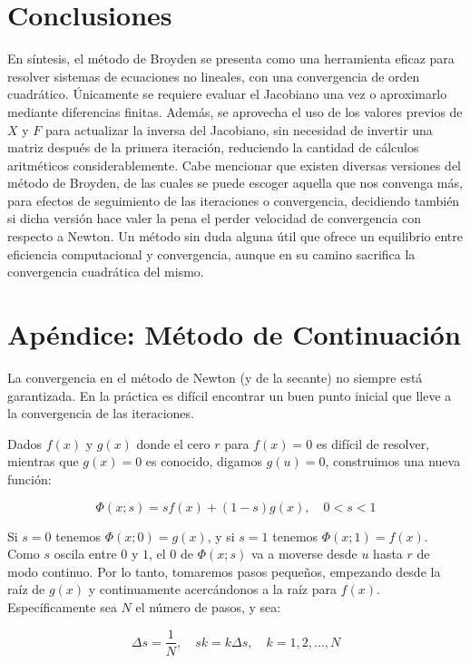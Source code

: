 \documentclass[12pt]{article}
\begin{document}
\section{Conclusiones}

En síntesis, el método de Broyden se presenta como una herramienta eficaz para resolver sistemas de ecuaciones no lineales, con una convergencia de orden cuadrático. Únicamente se requiere evaluar el Jacobiano una vez o aproximarlo mediante diferencias finitas. Además, se aprovecha el uso de los valores previos de $X$ y $F$ para actualizar la inversa del Jacobiano, sin necesidad de invertir una matriz después de la primera iteración, reduciendo la cantidad de cálculos aritméticos considerablemente. Cabe mencionar que existen diversas versiones del método de Broyden, de las cuales se puede escoger aquella que nos convenga más, para efectos de seguimiento de las iteraciones o convergencia, decidiendo también si dicha versión hace valer la pena el perder velocidad de convergencia con respecto a Newton. Un método sin duda alguna útil que ofrece un equilibrio entre eficiencia computacional y convergencia, aunque en su camino sacrifica la convergencia cuadrática del mismo.

\section{ Apéndice: Método de Continuación}
La convergencia en el método de Newton (y de la secante) no siempre está garantizada. En la práctica es difícil encontrar un buen punto inicial que lleve a la convergencia de las iteraciones.

Dados $f(x)$ y $g(x)$ donde el cero $r$ para $f(x)=0$ es difícil de resolver, mientras que $g(x)=0$ es conocido, digamos $g(u)=0$, construimos una nueva función:

\begin{equation*}
    \Phi(x; s) = s f(x) + (1 - s) g(x), \quad 0 < s < 1
\end{equation*}

Si $s = 0$ tenemos $\Phi(x;0) = g(x)$, y si $s = 1$ tenemos $\Phi(x;1) = f(x)$.
Como $s$ oscila entre $0$ y $1$, el $0$ de $\Phi(x;s)$ va a moverse desde $u$ hasta $r$ de modo continuo.
Por lo tanto, tomaremos pasos pequeños, empezando desde la raíz de $g(x)$ y continuamente acercándonos a la raíz para $f(x)$.
Específicamente sea $N$ el número de pasos, y sea:

\begin{equation*}
    \Delta s = \frac{1}{N}, \quad s k = k \Delta s, \quad k = 1, 2, \ldots, N
\end{equation*}
\end{document}
